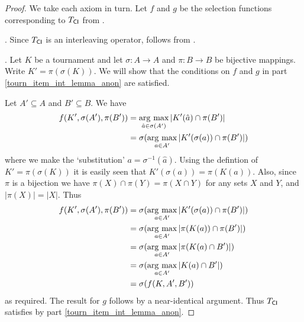 \begin{proof}

    We take each axiom in turn. Let $f$ and $g$ be the selection functions
    corresponding to ${T_{\mathsf{CI}}}$ from .

    \chaindef{}. Since ${T_{\mathsf{CI}}}$ is an interleaving operator,
    \chaindef{} follows from .

    \anon{}. Let $K$ be a tournament and let $\sigma: A \to A$ and $\pi:
    B \to B$ be bijective mappings. Write $K' = \pi(\sigma(K))$. We will show
    that the conditions on $f$ and $g$ in
     part
    \cref{tourn_item_int_lemma_anon} are satisfied.

    Let $A' \subseteq A$ and $B' \subseteq B$. We have
    \begin{align*}
        f(K', \sigma(A'), \pi(B'))
        &= \operatorname*{arg\ max}_{\hat{a} \in \sigma(A')}{|K'(\hat{a}) \cap \pi(B')|} \\
        &= \sigma(\operatorname*{arg\ max}_{a \in A'}{|K'(\sigma(a)) \cap \pi(B')|})
    \end{align*}
    where we make the `substitution' $a = \sigma^{-1}(\hat{a})$. Using the
    defintion of $K' = \pi(\sigma(K))$ it is easily seen that $K'(\sigma(a)) =
    \pi(K(a))$. Also, since $\pi$ is a bijection we have $\pi(X) \cap \pi(Y) =
    \pi(X \cap Y)$ for any sets $X$ and $Y$, and $|\pi(X)| = |X|$. Thus
    \begin{align*}
        f(K', \sigma(A'), \pi(B'))
        &= \sigma(\operatorname*{arg\ max}_{a \in A'}{|K'(\sigma(a)) \cap \pi(B')|}) \\
        &= \sigma(\operatorname*{arg\ max}_{a \in A'}{|\pi(K(a)) \cap \pi(B')|}) \\
        &= \sigma(\operatorname*{arg\ max}_{a \in A'}{|\pi(K(a) \cap B')|}) \\
        &= \sigma(\operatorname*{arg\ max}_{a \in A'}{|K(a) \cap B'|}) \\
        &= \sigma(f(K, A', B'))
    \end{align*}
    as required. The result for $g$ follows by a near-identical argument. Thus
    ${T_{\mathsf{CI}}}$ satisfies \anon{} by
     part
    \cref{tourn_item_int_lemma_anon}.


\end{proof}

